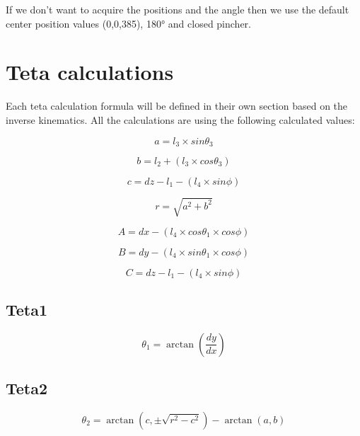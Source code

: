 			\hspace{15pt}If we don't want to acquire the positions and the angle then we use the default center position values (0,0,385), 180° and closed pincher.

	\section{Teta calculations}
	
		\hspace{15pt}Each teta calculation formula will be defined in their own section based on the inverse kinematics. All the calculations are using the following calculated values:
		
		\hspace{15pt}\[ a = l_3\times sin\theta_3 \]
		
		\hspace{15pt}\[ b = l_2 + (l_3\times cos\theta_3) \]
		
		\hspace{15pt}\[ c = dz - l_1 - (l_4\times sin\phi) \]
		
		\hspace{15pt}\[ r = \sqrt{a^2+b^2} \]
		
		\hspace{15pt}\[ A = dx - (l_4\times cos\theta_1 \times cos\phi) \]
		
		\hspace{15pt}\[ B = dy - (l_4\times sin\theta_1 \times cos\phi) \]
		
		\hspace{15pt}\[ C = dz - l_1 - (l_4\times sin\phi)\]
		
		\subsection{Teta1}
		
			\hspace{15pt}\[ \theta_1 = \arctan(\frac{dy}{dx}) \]
		
			
	
		\subsection{Teta2}
		
			\hspace{15pt}\[ \theta_2 = \arctan(c, \pm\sqrt{r^2-c^2}) - \arctan(a,b) \]
		

